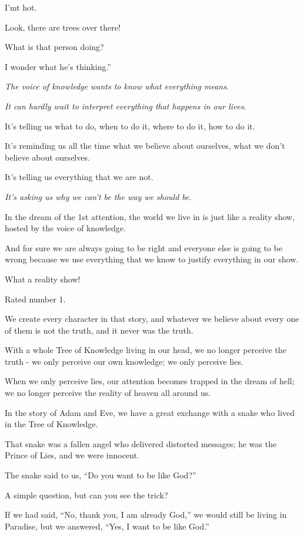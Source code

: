 \documentclass{article}
\numberwithin{equation}{section}
\begin{document}
I'mt hot.

Look, there are trees over there!

What is that person doing?

I wonder what he's thinking.''

\textit{The voice of knowledge wants to know what everything means}.

\textit{It can hardly wait to interpret everything that happens in our lives}.

It's telling us what to do, when to do it, where to do it, how to do it.

It's reminding us all the time what we believe about ourselves, what we don't believe about ourselves.

It's telling us everything that we are not.

\textit{It's asking us why we can't be the way we should be}.

%
In the dream of the 1st attention, the world we live in is just like a reality show, hosted by the voice of knowledge.

And for sure we are always going to be right and everyone else is going to be wrong because we use everything that we know to justify everything in our show.

What a reality show!

Rated number 1.

We create every character in that story, and whatever we believe about every one of them is not the truth, and it never was the truth.

With a whole Tree of Knowledge living in our head, we no longer perceive the truth - we only perceive our own knowledge; we only perceive lies.

When we only perceive lies, our attention becomes trapped in the dream of hell; we no longer perceive the reality of heaven all around us.


%
In the story of Adam and Eve, we have a great exchange with a snake who lived in the Tree of Knowledge.

That snake was a fallen angel who delivered distorted messages; he was the Prince of Lies, and we were innocent.

The snake said to us, ``Do you want to be like God?''

A simple question, but can you see the trick?

If we had said, ``No, thank you, I am already God,'' we would still be living in Paradise, but we answered, ``Yes, I want to be like God.''
\end{document}
